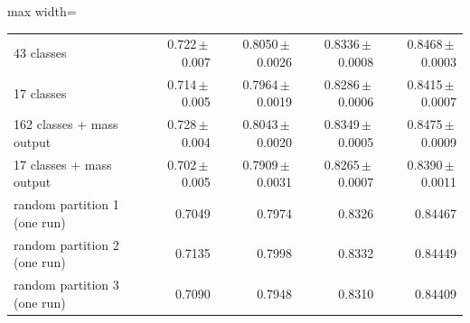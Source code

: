 \begin{table}[t]
\begin{adjustbox}{max width=\linewidth}
\begin{tabular}{l rrrr}
43 classes & 0.722\,$\pm$\,0.007 & 0.8050\,$\pm$\,0.0026 & 0.8336\,$\pm$\,0.0008 & 0.8468\,$\pm$\,0.0003 \\
17 classes & 0.714\,$\pm$\,0.005 & 0.7964\,$\pm$\,0.0019 & 0.8286\,$\pm$\,0.0006 & 0.8415\,$\pm$\,0.0007 \\
162 classes + mass output & 0.728\,$\pm$\,0.004 & 0.8043\,$\pm$\,0.0020 & 0.8349\,$\pm$\,0.0005 & 0.8475\,$\pm$\,0.0009 \\
17 classes + mass output & 0.702\,$\pm$\,0.005 & 0.7909\,$\pm$\,0.0031 & 0.8265\,$\pm$\,0.0007 & 0.8390\,$\pm$\,0.0011 \\
random partition 1 (one run) & 0.7049 & 0.7974 & 0.8326 & 0.84467 \\
random partition 2 (one run) & 0.7135 & 0.7998 & 0.8332 & 0.84449 \\
random partition 3 (one run) & 0.7090 & 0.7948 & 0.8310 & 0.84409 \\
\bottomrule
\end{tabular}
\end{adjustbox}
\end{table}
